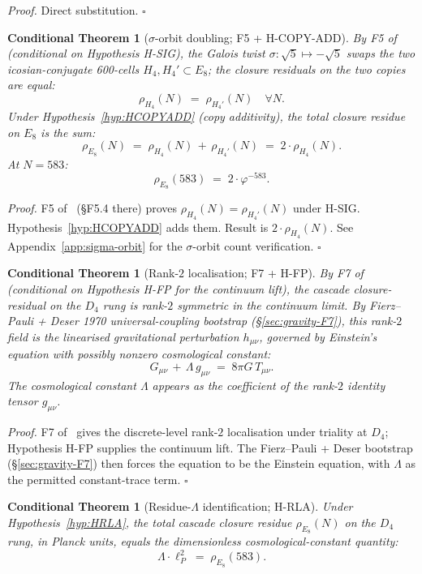 \documentclass[11pt]{article}
\theoremstyle{plain}
\newtheorem{conditional}[theorem]{Conditional Theorem}
\theoremstyle{definition}
\theoremstyle{remark}
\begin{document}
\noindent\emph{Proof.} Direct substitution. \hfill$\square$

\begin{conditional}[$\sigma$-orbit doubling; F5 + H-COPY-ADD]\label{cthm:factor-2}
By F5 of~\citet{SmartXXXVI} (conditional on Hypothesis H-SIG), the Galois twist $\sigma: \sqrt 5 \mapsto -\sqrt 5$ swaps the two icosian-conjugate 600-cells $H_4, H_4' \subset E_8$; the closure residuals on the two copies are equal:
\[
  \rho_{H_4}(N) \;=\; \rho_{H_4'}(N) \quad \forall N.
\]
Under Hypothesis~\ref{hyp:HCOPYADD} (copy additivity), the total closure residue on $E_8$ is the sum:
\[
  \rho_{E_8}(N) \;=\; \rho_{H_4}(N) \,+\, \rho_{H_4'}(N) \;=\; 2 \cdot \rho_{H_4}(N).
\]
At $N = 583$:
\[
  \rho_{E_8}(583) \;=\; 2 \cdot \varphi^{-583}.
\]
\end{conditional}

\noindent\emph{Proof.} F5 of~\citet{SmartXXXVI} (\S F5.4 there) proves $\rho_{H_4}(N) = \rho_{H_4'}(N)$ under H-SIG. Hypothesis~\ref{hyp:HCOPYADD} adds them. Result is $2 \cdot \rho_{H_4}(N)$. See Appendix~\ref{app:sigma-orbit} for the $\sigma$-orbit count verification. \hfill$\square$

\begin{conditional}[Rank-$2$ localisation; F7 + H-FP]\label{cthm:rank-2}
By F7 of~\citet{SmartXXXVI} (conditional on Hypothesis H-FP for the continuum lift), the cascade closure-residual on the $D_4$ rung is rank-$2$ symmetric in the continuum limit. By Fierz--Pauli + Deser 1970 universal-coupling bootstrap (\S\ref{sec:gravity-F7}), this rank-$2$ field is the linearised gravitational perturbation $h_{\mu\nu}$, governed by Einstein's equation with possibly nonzero cosmological constant:
\[
  G_{\mu\nu} \,+\, \Lambda \,g_{\mu\nu} \;=\; 8\pi G\, T_{\mu\nu}.
\]
The cosmological constant $\Lambda$ appears as the coefficient of the rank-$2$ identity tensor $g_{\mu\nu}$.
\end{conditional}

\noindent\emph{Proof.} F7 of~\citet{SmartXXXVI} gives the discrete-level rank-$2$ localisation under triality at $D_4$; Hypothesis H-FP supplies the continuum lift. The Fierz--Pauli + Deser bootstrap (\S\ref{sec:gravity-F7}) then forces the equation to be the Einstein equation, with $\Lambda$ as the permitted constant-trace term. \hfill$\square$

\begin{conditional}[Residue-$\Lambda$ identification; H-RLA]\label{cthm:residue-lambda}
Under Hypothesis~\ref{hyp:HRLA}, the total cascade closure residue $\rho_{E_8}(N)$ on the $D_4$ rung, in Planck units, equals the dimensionless cosmological-constant quantity:
\[
  \Lambda \cdot \ell_P^2 \;=\; \rho_{E_8}(583).
\]
\end{conditional}
\end{document}
